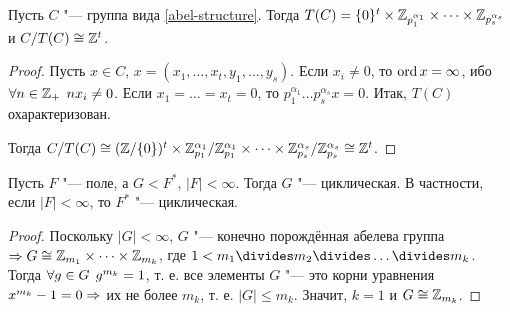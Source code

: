 \documentclass[main]{subfiles}
\begin{document}
\begin{proposition}
  Пусть \( C \) "--- группа вида \eqref{abel-structure}.
  Тогда \( T(C) = \{ 0 \}^t \times \mathbb{Z}_{p_1^{\alpha_1}}
  \times \dots \times \mathbb{Z}_{p_s^{\alpha_s}} \) и
  \( \Factor{C}[T(C)] \cong \Integer^t \).
\end{proposition}
\begin{proof}
  Пусть \( x \in C \), \( x = (x_1, \dots, x_t, y_1, \dots, y_s) \).
  Если \( x_i \ne 0 \), то \( \operatorname{ord} x = \infty \), ибо
  \( \forall {n \in \mathbb{Z}_+} \; \, n x_i \ne 0 \).
  Если \( x_1 = \dots = x_t = 0 \), то
  \( p_1^{\alpha_1} \dots p_s^{\alpha_s} x = 0 \).
  Итак, \( T(C) \) охарактеризован.

  Тогда \( \Factor{C}[T(C)] \cong
  (\Factor{\Integer}[\{ 0 \}])^t \times
  \Factor{\Integer_{p_1}^{\alpha_1}}[\Integer_{p_1}^{\alpha_1}]
  \times \dots \times
  \Factor{\Integer_{p_s}^{\alpha_s}}[\Integer_{p_s}^{\alpha_s}]
  \cong \Integer^t \).
\end{proof}

\begin{theorem}
  Пусть \( F \) "--- поле, а \( G < F^* \),
  \( |F| < \infty \). Тогда \( G \) "--- циклическая.
  В частности, если \( |F| < \infty \), то
  \( F^* \) "--- циклическая.
\end{theorem}
\begin{proof}
  Поскольку \( |G| < \infty \), \( G \) "--- конечно порождённая
  абелева группа \( \Rightarrow G \cong \mathbb{Z}_{m_1} \times
  \dots \times \mathbb{Z}_{m_k} \), где
  \( 1 < m_1 \divides m_2 \divides \dots \divides m_k \).
  Тогда \( \forall {g \in G} \; \, g^{m_k} = 1 \),
  т. е. все элементы \( G \) "--- это корни уравнения
  \( x^{m_k} - 1 = 0 \Rightarrow \) их не более \( m_k \),
  т. е. \( |G| \le m_k \). Значит, \( k = 1 \)
  и \( G \cong \mathbb{Z}_{m_k} \).
\end{proof}
\end{document}

